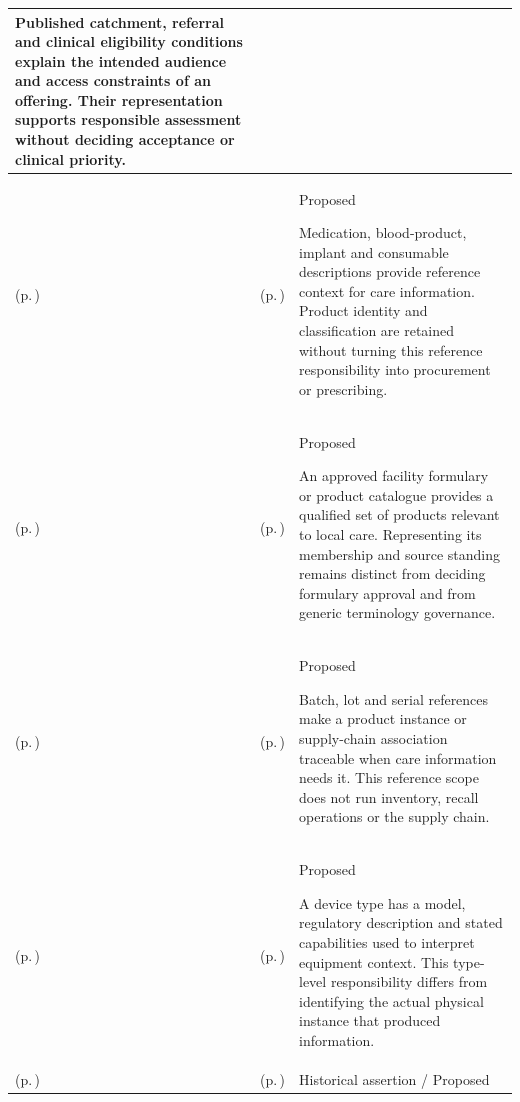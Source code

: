 \begin{longtable}{|>{\raggedright\arraybackslash}p{0.27\TableWidth}|>{\raggedright\arraybackslash}p{0.27\TableWidth}|>{\raggedright\arraybackslash}p{0.46\TableWidth}|}
Published catchment, referral and clinical eligibility conditions explain the intended audience and access constraints of an offering. Their representation supports responsible assessment without deciding acceptance or clinical priority.\\\hline
\nameref{cap:bec-health-product-administration} (p.\,\pageref{cap:bec-health-product-administration}) & \nameref{cap:bec-health-product-definition} (p.\,\pageref{cap:bec-health-product-definition}) & Proposed

Medication, blood-product, implant and consumable descriptions provide reference context for care information. Product identity and classification are retained without turning this reference responsibility into procurement or prescribing.\\\hline
\nameref{cap:bec-health-product-administration} (p.\,\pageref{cap:bec-health-product-administration}) & \nameref{cap:bec-product-formulary-catalogue} (p.\,\pageref{cap:bec-product-formulary-catalogue}) & Proposed

An approved facility formulary or product catalogue provides a qualified set of products relevant to local care. Representing its membership and source standing remains distinct from deciding formulary approval and from generic terminology governance.\\\hline
\nameref{cap:bec-health-product-administration} (p.\,\pageref{cap:bec-health-product-administration}) & \nameref{cap:bec-product-batch-serial-tracking} (p.\,\pageref{cap:bec-product-batch-serial-tracking}) & Proposed

Batch, lot and serial references make a product instance or supply-chain association traceable when care information needs it. This reference scope does not run inventory, recall operations or the supply chain.\\\hline
\nameref{cap:bec-clinical-device-administration} (p.\,\pageref{cap:bec-clinical-device-administration}) & \nameref{cap:bec-device-definition} (p.\,\pageref{cap:bec-device-definition}) & Proposed

A device type has a model, regulatory description and stated capabilities used to interpret equipment context. This type-level responsibility differs from identifying the actual physical instance that produced information.\\\hline
\nameref{cap:bec-clinical-device-administration} (p.\,\pageref{cap:bec-clinical-device-administration}) & \nameref{cap:bec-device-instance} (p.\,\pageref{cap:bec-device-instance}) & Historical assertion / Proposed


\end{longtable}
